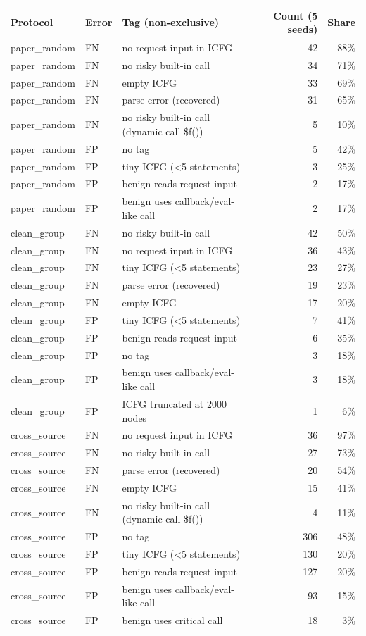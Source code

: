 \begin{tabular}{@{}lllrr@{}}
\toprule
Protocol & Error & Tag (non-exclusive) & Count (5 seeds) & Share \\ \midrule
paper\_random & FN & no request input in ICFG & 42 & 88\% \\
paper\_random & FN & no risky built-in call & 34 & 71\% \\
paper\_random & FN & empty ICFG & 33 & 69\% \\
paper\_random & FN & parse error (recovered) & 31 & 65\% \\
paper\_random & FN & no risky built-in call (dynamic call \$f()) & 5 & 10\% \\
paper\_random & FP & no tag & 5 & 42\% \\
paper\_random & FP & tiny ICFG (<5 statements) & 3 & 25\% \\
paper\_random & FP & benign reads request input & 2 & 17\% \\
paper\_random & FP & benign uses callback/eval-like call & 2 & 17\% \\
clean\_group & FN & no risky built-in call & 42 & 50\% \\
clean\_group & FN & no request input in ICFG & 36 & 43\% \\
clean\_group & FN & tiny ICFG (<5 statements) & 23 & 27\% \\
clean\_group & FN & parse error (recovered) & 19 & 23\% \\
clean\_group & FN & empty ICFG & 17 & 20\% \\
clean\_group & FP & tiny ICFG (<5 statements) & 7 & 41\% \\
clean\_group & FP & benign reads request input & 6 & 35\% \\
clean\_group & FP & no tag & 3 & 18\% \\
clean\_group & FP & benign uses callback/eval-like call & 3 & 18\% \\
clean\_group & FP & ICFG truncated at 2000 nodes & 1 & 6\% \\
cross\_source & FN & no request input in ICFG & 36 & 97\% \\
cross\_source & FN & no risky built-in call & 27 & 73\% \\
cross\_source & FN & parse error (recovered) & 20 & 54\% \\
cross\_source & FN & empty ICFG & 15 & 41\% \\
cross\_source & FN & no risky built-in call (dynamic call \$f()) & 4 & 11\% \\
cross\_source & FP & no tag & 306 & 48\% \\
cross\_source & FP & tiny ICFG (<5 statements) & 130 & 20\% \\
cross\_source & FP & benign reads request input & 127 & 20\% \\
cross\_source & FP & benign uses callback/eval-like call & 93 & 15\% \\
cross\_source & FP & benign uses critical call & 18 & 3\% \\
\bottomrule
\end{tabular}
